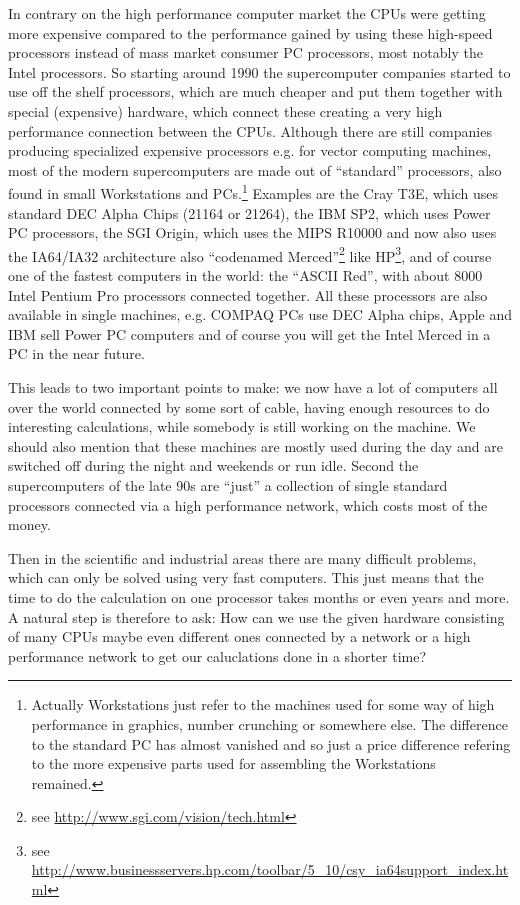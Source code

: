 In contrary on the high performance computer market the CPUs were getting more
expensive compared to the performance gained by using these high-speed
processors instead of mass market consumer PC processors, most notably the
Intel processors. So starting around 1990 the supercomputer companies
started to use off the shelf processors, which are much cheaper and
put them together with special (expensive) hardware, which connect
these creating a very high performance connection between
the CPUs. Although there are still companies producing specialized expensive
processors e.g. for vector computing machines, most of
the modern supercomputers are made out of ``standard'' processors,
also found in small Workstations and PCs.\footnote{Actually Workstations 
just refer to the machines used for some way of high performance
in graphics, number crunching or somewhere else. The difference to
the standard PC has almost vanished and so just a price
difference refering to the more  expensive parts used for 
assembling the Workstations remained.} 
Examples are the Cray T3E, which uses standard DEC Alpha Chips 
(21164 or 21264), the IBM SP2, which uses Power PC processors, the 
SGI Origin, which uses the MIPS R10000 and now also uses the 
IA64/IA32 architecture also ``codenamed Merced''\footnote{see %
\href{http://www.sgi.com/vision/tech.html}%
{http://www.sgi.com/vision/tech.html} }
like HP\footnote{see %
\href{http://www.businessservers.hp.com/toolbar/5_10/csy_ia64support_index.html}%
{http://www.businessservers.hp.com/toolbar/5\_10/csy\_ia64support\_index.html}}, 
and of course one of the fastest
computers in the world: the ``ASCII Red'', with about 8000 Intel Pentium Pro
processors connected together.
All these processors are
also available in single machines, e.g. COMPAQ PCs use DEC Alpha
chips, Apple and IBM sell Power PC computers and of course you
will get the Intel Merced in a PC in the near future. 

This leads to two important points to make: we now have a lot of
computers all over the world connected by some sort of cable,
having enough resources to do 
interesting calculations, while somebody is still working on the
machine. We should also mention that these machines are mostly used
during the day and are switched off during the night and weekends
or run idle. Second the supercomputers of the late 90s are ``just'' 
a collection of single standard processors connected via a high
performance network, which costs most of the money. 

Then in the scientific and industrial areas
there are many difficult problems, which can
only be solved using very fast computers. This just means that
the time to do the calculation on one processor takes months or
even years and more. A natural step 
is therefore to ask: How can we use the given hardware consisting
of many CPUs maybe even different ones connected by a network or
a high performance network to get our caluclations done in a
shorter time?

